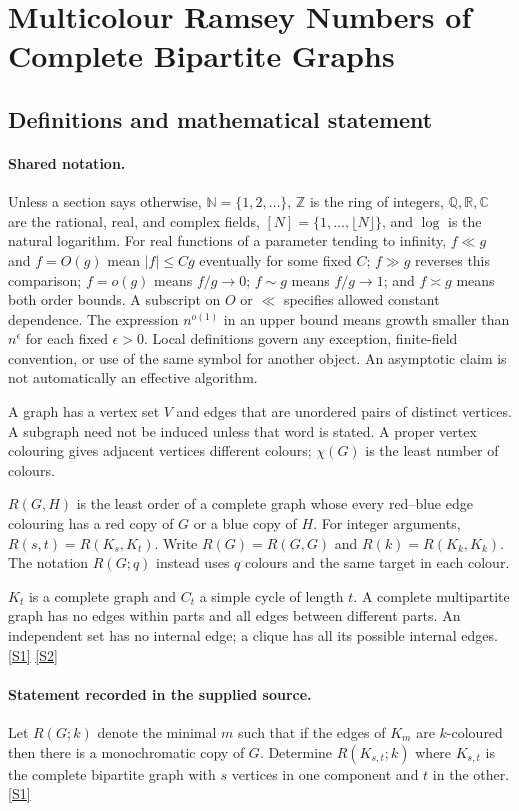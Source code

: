 \documentclass[11pt,a4paper]{article}
\newcommand{\N}{\mathbb{N}}
\newcommand{\Z}{\mathbb{Z}}
\newcommand{\Q}{\mathbb{Q}}
\newcommand{\R}{\mathbb{R}}
\newcommand{\C}{\mathbb{C}}
\newcommand{\sref}[2]{\hyperlink{source:#1:#2}{[S#2]}}
\begin{document}
\section{Multicolour Ramsey Numbers of Complete Bipartite Graphs}\label{statement}


\subsection{Definitions and mathematical statement}

\paragraph{Shared notation.}Unless a section says otherwise, $\N=\{1,2,\ldots\}$,
$\Z$ is the ring of integers, $\Q,\R,\C$ are the rational, real, and complex
fields, $[N]=\{1,\ldots,\lfloor N\rfloor\}$, and $\log$ is the natural
logarithm. For real functions of a parameter tending to infinity,
$f\ll g$ and $f=O(g)$ mean $|f|\leq Cg$ eventually for some fixed $C$;
$f\gg g$ reverses this comparison; $f=o(g)$ means $f/g\to0$;
$f\sim g$ means $f/g\to1$; and $f\asymp g$ means both order bounds.
A subscript on $O$ or $\ll$ specifies allowed constant dependence.
The expression $n^{o(1)}$ in an upper bound means growth smaller than
$n^\epsilon$ for each fixed $\epsilon>0$. Local definitions govern any
exception, finite-field convention, or use of the same symbol for another
object. An asymptotic claim is not automatically an effective algorithm.



A graph has a vertex set $V$ and edges that are unordered pairs of distinct vertices. A subgraph need not be induced unless that word is stated. A proper vertex colouring gives adjacent vertices different colours; $\chi(G)$ is the least number of colours.

$R(G,H)$ is the least order of a complete graph whose every red--blue edge colouring has a red copy of $G$ or a blue copy of $H$. For integer arguments, $R(s,t)=R(K_s,K_t)$. Write $R(G)=R(G,G)$ and $R(k)=R(K_k,K_k)$. The notation $R(G;q)$ instead uses $q$ colours and the same target in each colour.

$K_t$ is a complete graph and $C_t$ a simple cycle of length $t$. A complete multipartite graph has no edges within parts and all edges between different parts. An independent set has no internal edge; a clique has all its possible internal edges. \sref{statement}{1} \sref{statement}{2}

\paragraph{Statement recorded in the supplied source.}
Let $R(G;k)$ denote the minimal $m$ such that if the edges of $K_m$ are $k$-coloured then there is a monochromatic copy of $G$. Determine $ R(K_{s,t};k) $ where $K_{s,t}$ is the complete bipartite graph with $s$ vertices in one component and $t$ in the other. \sref{statement}{1}
\end{document}
